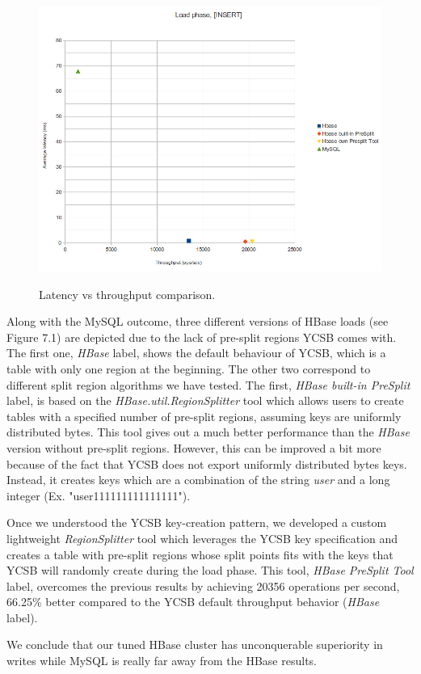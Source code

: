 \begin{figure}[htb]
\centering
\includegraphics[width=1\textwidth]{./images/load.png}
 \label{fig:load}
\caption{Latency vs throughput comparison.}
\end{figure}


Along with the MySQL outcome, three different versions of HBase loads (see Figure 7.1) are depicted due to the lack of pre-split regions YCSB comes with. The first one, \textit{HBase} label, shows the default behaviour of YCSB, which is a table with only one region at the beginning. The other two correspond to different split region algorithms we have tested. The first, \textit{HBase built-in PreSplit} label, is based on the \textit{HBase.util.RegionSplitter} tool which allows users to create tables with a specified number of pre-split regions, assuming keys are uniformly distributed bytes. This tool gives out a much better performance than the \textit{HBase} version without pre-split regions. However, this can be improved a bit more because of the fact that YCSB does not export uniformly distributed bytes keys. Instead, it creates keys which are a combination of the string \textit{user} and a long integer (Ex. "user111111111111111").
\par
Once we understood the YCSB key-creation pattern, we developed a custom lightweight \textit{RegionSplitter} tool which leverages the YCSB key specification and creates a table with pre-split regions whose split points fits with the keys that YCSB will randomly create during the load phase. This tool, \textit{HBase PreSplit Tool} label, overcomes the previous results by achieving 20356 operations per second,  66.25\% better compared to the YCSB default throughput behavior (\textit{HBase} label). 
\par
We conclude that our tuned HBase cluster has unconquerable superiority in writes while MySQL is really far away from the HBase results.



